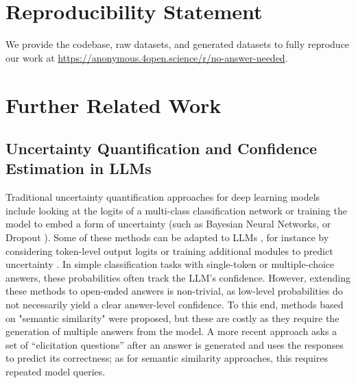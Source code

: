 \documentclass{article} %
\begin{document}
\section{Reproducibility Statement}
We provide the codebase, raw datasets, and generated datasets to fully reproduce our work at \url{https://anonymous.4open.science/r/no-answer-needed}. 




\newpage
\appendix
\section{Further Related Work}
\label{app:related}
\subsection{Uncertainty Quantification and Confidence Estimation in LLMs}
Traditional uncertainty quantification approaches for deep learning models include looking at the logits of a multi-class classification network \citep{guo2017calibration} or training the model to embed a form of uncertainty (such as Bayesian Neural Networks, \citep{jospin2022hands} or Dropout \citep{gal2016dropout}). Some of these methods can be adapted to LLMs \citep{shorinwa2024survey}, for instance by considering token-level output logits \citep{DBLP:journals/corr/abs-2207-05221,fadeeva-etal-2024-fact} or training additional modules to predict uncertainty \citep{DBLP:journals/corr/abs-2207-05221}. In simple classification tasks with single-token or multiple-choice answers, these probabilities often track the LLM's confidence. However, extending these methods to open-ended answers is non-trivial, as low-level probabilities do not necessarily yield a clear answer-level confidence. To this end, methods based on "semantic similarity" \citep{kuhn2023semantic} were proposed, but these are costly as they require the generation of multiple answers from the model. A more recent approach  \citep{sam2025predictingperformanceblackboxllms} asks a set of “elicitation questions” after an answer is generated and uses the responses to predict its correctness; as for semantic similarity approaches, this requires repeated model queries.

\end{document}
